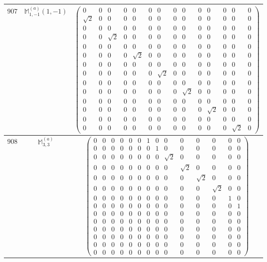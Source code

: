\documentclass[fleqn,8pt,landscape]{jsarticle}
\begin{document}
\begin{center}
\begin{longtable}{ccc}
$ 907 $ & $ \mathbb{M}_{1,-1}^{(a)}(1,-1) $ & $ \begin{pmatrix} 0 & 0 & 0 & 0 & 0 & 0 & 0 & 0 & 0 & 0 & 0 & 0 & 0 & 0 \\ \sqrt{2} & 0 & 0 & 0 & 0 & 0 & 0 & 0 & 0 & 0 & 0 & 0 & 0 & 0 \\ 0 & 0 & 0 & 0 & 0 & 0 & 0 & 0 & 0 & 0 & 0 & 0 & 0 & 0 \\ 0 & 0 & \sqrt{2} & 0 & 0 & 0 & 0 & 0 & 0 & 0 & 0 & 0 & 0 & 0 \\ 0 & 0 & 0 & 0 & 0 & 0 & 0 & 0 & 0 & 0 & 0 & 0 & 0 & 0 \\ 0 & 0 & 0 & 0 & \sqrt{2} & 0 & 0 & 0 & 0 & 0 & 0 & 0 & 0 & 0 \\ 0 & 0 & 0 & 0 & 0 & 0 & 0 & 0 & 0 & 0 & 0 & 0 & 0 & 0 \\ 0 & 0 & 0 & 0 & 0 & 0 & \sqrt{2} & 0 & 0 & 0 & 0 & 0 & 0 & 0 \\ 0 & 0 & 0 & 0 & 0 & 0 & 0 & 0 & 0 & 0 & 0 & 0 & 0 & 0 \\ 0 & 0 & 0 & 0 & 0 & 0 & 0 & 0 & \sqrt{2} & 0 & 0 & 0 & 0 & 0 \\ 0 & 0 & 0 & 0 & 0 & 0 & 0 & 0 & 0 & 0 & 0 & 0 & 0 & 0 \\ 0 & 0 & 0 & 0 & 0 & 0 & 0 & 0 & 0 & 0 & \sqrt{2} & 0 & 0 & 0 \\ 0 & 0 & 0 & 0 & 0 & 0 & 0 & 0 & 0 & 0 & 0 & 0 & 0 & 0 \\ 0 & 0 & 0 & 0 & 0 & 0 & 0 & 0 & 0 & 0 & 0 & 0 & \sqrt{2} & 0 \end{pmatrix} $ \\ \hline
$ 908 $ & $ \mathbb{M}_{3,3}^{(a)} $ & $ \begin{pmatrix} 0 & 0 & 0 & 0 & 0 & 0 & 1 & 0 & 0 & 0 & 0 & 0 & 0 & 0 \\ 0 & 0 & 0 & 0 & 0 & 0 & 0 & 1 & 0 & 0 & 0 & 0 & 0 & 0 \\ 0 & 0 & 0 & 0 & 0 & 0 & 0 & 0 & \sqrt{2} & 0 & 0 & 0 & 0 & 0 \\ 0 & 0 & 0 & 0 & 0 & 0 & 0 & 0 & 0 & \sqrt{2} & 0 & 0 & 0 & 0 \\ 0 & 0 & 0 & 0 & 0 & 0 & 0 & 0 & 0 & 0 & \sqrt{2} & 0 & 0 & 0 \\ 0 & 0 & 0 & 0 & 0 & 0 & 0 & 0 & 0 & 0 & 0 & \sqrt{2} & 0 & 0 \\ 0 & 0 & 0 & 0 & 0 & 0 & 0 & 0 & 0 & 0 & 0 & 0 & 1 & 0 \\ 0 & 0 & 0 & 0 & 0 & 0 & 0 & 0 & 0 & 0 & 0 & 0 & 0 & 1 \\ 0 & 0 & 0 & 0 & 0 & 0 & 0 & 0 & 0 & 0 & 0 & 0 & 0 & 0 \\ 0 & 0 & 0 & 0 & 0 & 0 & 0 & 0 & 0 & 0 & 0 & 0 & 0 & 0 \\ 0 & 0 & 0 & 0 & 0 & 0 & 0 & 0 & 0 & 0 & 0 & 0 & 0 & 0 \\ 0 & 0 & 0 & 0 & 0 & 0 & 0 & 0 & 0 & 0 & 0 & 0 & 0 & 0 \\ 0 & 0 & 0 & 0 & 0 & 0 & 0 & 0 & 0 & 0 & 0 & 0 & 0 & 0 \\ 0 & 0 & 0 & 0 & 0 & 0 & 0 & 0 & 0 & 0 & 0 & 0 & 0 & 0 \end{pmatrix} $ \\ \hline

\end{longtable}
\end{center}
\end{document}
